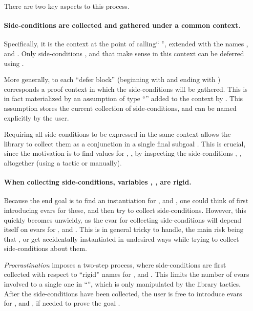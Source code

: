 \documentclass[xetex,format=acmlarge,screen=true,authorversion=true]{acmart-modified}
\begin{document}
There are two key aspects to this process.

\paragraph{Side-conditions are collected and gathered under a common context.}
Specifically, it is the context at the point of calling``
'', extended with the names ,
 and . Only side-conditions ,  and  that make
sense in this context can be deferred using .

More generally, to each ``defer block'' (beginning with  and ending with ) corresponds a proof
context in which the side-conditions will be gathered. This is in fact
materialized by an assumption of type ``'' added to the context
by . This assumption stores the current collection of
side-conditions, and can be named explicitly by the user.

Requiring all side-conditions to be expressed in the same context allows the
library to collect them as a conjunction in a single final subgoal . This is crucial, since the motivation is to find values
for , ,  by inspecting the side-conditions , ,
 altogether (using a tactic or manually).


\paragraph{When collecting side-conditions, variables , ,  are rigid.}
Because the end goal is to find an instantiation for ,  and ,
one could think of first introducing evars for these, and then try to collect
side-conditions. However, this quickly becomes unwieldy, as the evar for
collecting side-conditions will depend itself on evars for ,  and
. This is in general tricky to handle, the main risk being that ,
 or  get accidentally instantiated in undesired ways while trying
to collect side-conditions about them.

\emph{Procrastination} imposes a two-step process, where side-conditions are
first collected with respect to ``rigid'' names for ,  and .
This limits the number of evars involved to a single one in ``'', which is only manipulated by the library tactics. After the
side-conditions have been collected, the user is free to introduce evars for
,  and , if needed to prove the goal .
\end{document}
